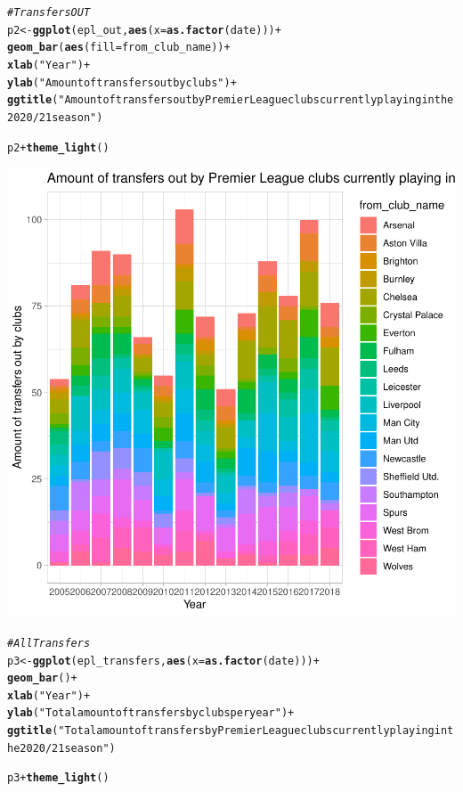 \documentclass{article}\usepackage[]{graphicx}\usepackage[]{color}
\makeatletter
\newcommand{\hlstr}[1]{\textcolor[rgb]{0.192,0.494,0.8}{#1}}%
\newcommand{\hlcom}[1]{\textcolor[rgb]{0.678,0.584,0.686}{\textit{#1}}}%
\newcommand{\hlopt}[1]{\textcolor[rgb]{0,0,0}{#1}}%
\newcommand{\hlstd}[1]{\textcolor[rgb]{0.345,0.345,0.345}{#1}}%
\newcommand{\hlkwb}[1]{\textcolor[rgb]{0.69,0.353,0.396}{#1}}%
\newcommand{\hlkwc}[1]{\textcolor[rgb]{0.333,0.667,0.333}{#1}}%
\newcommand{\hlkwd}[1]{\textcolor[rgb]{0.737,0.353,0.396}{\textbf{#1}}}%
\newenvironment{kframe}{%
 \def\at@end@of@kframe{}%
 \ifinner\ifhmode%
  \def\at@end@of@kframe{\end{minipage}}%
  \begin{minipage}{\columnwidth}%
 \fi\fi%
 \def\FrameCommand##1{\hskip\@totalleftmargin \hskip-\fboxsep
 \colorbox{shadecolor}{##1}\hskip-\fboxsep
     \hskip-\linewidth \hskip-\@totalleftmargin \hskip\columnwidth}%
 \MakeFramed {\advance\hsize-\width
   \@totalleftmargin\z@ \linewidth\hsize
   \@setminipage}}%
 {\par\unskip\endMakeFramed%
 \at@end@of@kframe}
\newenvironment{knitrout}{}{} %
\makeatother
\begin{document}
\begin{knitrout}
{}


\begin{kframe}\begin{alltt}
\hlcom{# Transfers OUT}
\hlstd{p2} \hlkwb{<-} \hlkwd{ggplot}\hlstd{(epl_out,} \hlkwd{aes}\hlstd{(}\hlkwc{x} \hlstd{=} \hlkwd{as.factor}\hlstd{(date)))} \hlopt{+}
  \hlkwd{geom_bar}\hlstd{(}\hlkwd{aes}\hlstd{(}\hlkwc{fill}\hlstd{=from_club_name))} \hlopt{+}
  \hlkwd{xlab}\hlstd{(}\hlstr{"Year"}\hlstd{)} \hlopt{+}
  \hlkwd{ylab}\hlstd{(}\hlstr{"Amount of transfers out by clubs"}\hlstd{)} \hlopt{+}
  \hlkwd{ggtitle}\hlstd{(}\hlstr{"Amount of transfers out by Premier League clubs currently playing in the 2020/21 season"}\hlstd{)}

\hlstd{p2} \hlopt{+} \hlkwd{theme_light}\hlstd{()}
\end{alltt}
\end{kframe}

{\centering \includegraphics[width=.6\linewidth]{figure/5670721-assignment-eda-Rnwauto-report-2} 

}


\begin{kframe}\begin{alltt}
\hlcom{# All Transfers}
\hlstd{p3} \hlkwb{<-} \hlkwd{ggplot}\hlstd{(epl_transfers,} \hlkwd{aes}\hlstd{(}\hlkwc{x} \hlstd{=} \hlkwd{as.factor}\hlstd{(date)))} \hlopt{+}
  \hlkwd{geom_bar}\hlstd{()} \hlopt{+}
  \hlkwd{xlab}\hlstd{(}\hlstr{"Year"}\hlstd{)} \hlopt{+}
  \hlkwd{ylab}\hlstd{(}\hlstr{"Total amount of transfers by clubs per year"}\hlstd{)} \hlopt{+}
  \hlkwd{ggtitle}\hlstd{(}\hlstr{"Total amount of transfers by Premier League clubs currently playing in the 2020/21 season"}\hlstd{)}

\hlstd{p3} \hlopt{+} \hlkwd{theme_light}\hlstd{()}
\end{alltt}
\end{kframe}


\end{knitrout}
\end{document}
